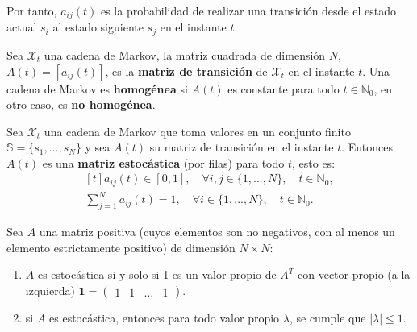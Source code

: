 Por tanto, $a_{ij}(t)$ es la probabilidad de realizar una transición desde el estado actual $s_i$ al estado siguiente $s_j$ en el instante $t$.

\begin{definition}
Sea $\mathcal{X}_t$ una cadena de Markov, la matriz cuadrada de dimensión $N$,  $A(t)=[a_{ij}(t)]$, es la \textbf{matriz de transición} de $\mathcal{X}_t$ en el instante $t$. Una cadena de Markov es \textbf{homogénea} si $A(t)$ es constante para todo $t\in\mathbb{N}_0$, en otro caso, es \textbf{no homogénea}. 
\end{definition}

\begin{definition}
Sea $\mathcal{X}_t$ una cadena de Markov que toma valores en un conjunto finito $\mathbb{S}=\{s_1,...,s_N\}$ y sea $A(t)$ su matriz de transición en el instante $t$. Entonces $A(t)$ es una \textbf{matriz estocástica} (por filas) para todo $t$, esto es:
\[
\begin{aligned}[t]
a_{ij}(t)\in[0,1],\quad \forall i,j \in \{1,...,N\},\quad t\in\mathbb{N}_0,\\
\sum_{j=1}^N a_{ij}(t)=1, \quad \forall i\in\{1,...,N\},\quad t\in\mathbb{N}_0.
\end{aligned}
\]
\end{definition}

\begin{proposition}\label{propiedadMatrizEstocástica}
    
Sea $A$ una matriz positiva (cuyos elementos son no negativos, con al menos un elemento estrictamente positivo) de dimensión $N\times N$:
\begin{enumerate}
    \item $A$ es estocástica si y solo si 1 es un valor propio de $A^T$ con vector propio (a la izquierda) $\mathbf{1}=\begin{pmatrix}1 & 1 & \dots & 1\end{pmatrix}$.
    \item si $A$ es estocástica, entonces para todo valor propio $\lambda$, se cumple que  $\left|\lambda\right|\leq1.$
\end{enumerate}
\end{proposition}

